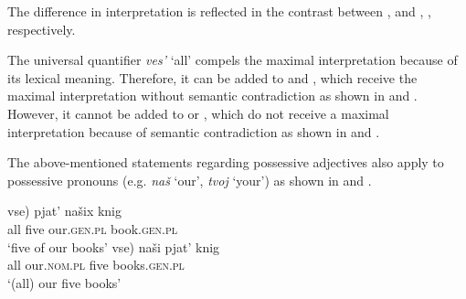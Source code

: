 \documentclass[output=paper,
colorlinks,
citecolor=brown,
newtxmath
]{langscibook}
\begin{document}
The difference in interpretation is reflected in the contrast between ,  and , , respectively.

\ea\label{Num-PossALL}
\z\z

\ea\label{Num-Poss2ALL}
\z\z

\noindent The universal quantifier \textit{ves'} `all' compels the maximal interpretation because of its lexical meaning. Therefore, it can be added to  and , which receive the maximal interpretation without semantic contradiction as shown in  and . However, it cannot be added to  or , which do not receive a maximal interpretation because of semantic contradiction as shown in  and .

The above-mentioned statements regarding possessive adjectives also apply to possessive pronouns (e.g. \textit{naš} `our', \textit{tvoj} `your') as shown in  and .

\ea\label{Num-Possprn}
\ea\label{NumPossprn}
\gll \minsp{(*} vse) pjat' našix knig\\
{} all five our.\textsc{gen.pl} book.\textsc{gen.pl}\\
\glt `five of our books'
\ex\label{PossprnNum}
\gll \minsp{(} vse) naši pjat' knig\\
{} all our.\textsc{nom.pl} five books.\textsc{gen.pl}\\
\glt `(all) our five books'
\z\z
\end{document}
